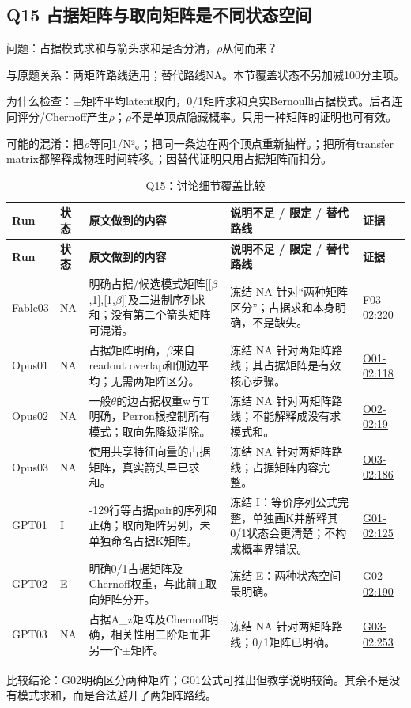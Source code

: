 \documentclass[11pt,a4paper]{article}
\begin{document}
\clearpage
\subsection{Q15 占据矩阵与取向矩阵是不同状态空间}
\label{aspect:Q15}
问题：占据模式求和与箭头求和是否分清，\ensuremath{\rho}从何而来？

与原题关系：两矩阵路线适用；替代路线NA。本节覆盖状态不另加减100分主项。

为什么检查：\ensuremath{\pm}矩阵平均latent取向，0/1矩阵求和真实Bernoulli占据模式。后者连同评分/Chernoff产生\ensuremath{\rho}；\ensuremath{\rho}不是单顶点隐藏概率。只用一种矩阵的证明也可有效。

可能的混淆：把\ensuremath{\rho}等同1/N²。；把同一条边在两个顶点重新抽样。；把所有transfer matrix都解释成物理时间转移。；因替代证明只用占据矩阵而扣分。

{\fontsize{9.0}{12.6}\selectfont
\setlength{\tabcolsep}{2.5pt}
\begin{longtable}{>{\raggedright\arraybackslash}p{}>{\raggedright\arraybackslash}p{}>{\raggedright\arraybackslash}p{}>{\raggedright\arraybackslash}p{}>{\raggedright\arraybackslash}p{}}
\caption{Q15：讨论细节覆盖比较}\\
\toprule
\textbf{Run} & \textbf{状态} & \textbf{原文做到的内容} & \textbf{说明不足 / 限定 / 替代路线} & \textbf{证据}\tabularnewline
\midrule
\endfirsthead
\toprule
\textbf{Run} & \textbf{状态} & \textbf{原文做到的内容} & \textbf{说明不足 / 限定 / 替代路线} & \textbf{证据}\tabularnewline
\midrule
\endhead
{}Fable03 & NA & 明确占据/候选模式矩阵[[\ensuremath{\beta},1],[1,\ensuremath{\beta}]]及二进制序列求和；没有第二个箭头矩阵可混淆。 & 冻结 NA 针对“两种矩阵区分”；占据求和本身明确，不是缺失。 & \hyperref[src:F03-02]{F03-02:220}\tabularnewline
{}Opus01 & NA & 占据矩阵明确，\ensuremath{\beta}来自readout overlap和侧边平均；无需两矩阵区分。 & 冻结 NA 针对两矩阵路线；其占据矩阵是有效核心步骤。 & \hyperref[src:O01-02]{O01-02:118}\tabularnewline
{}Opus02 & NA & 一般\ensuremath{\theta}的边占据权重w与T明确，Perron根控制所有模式；取向先降级消除。 & 冻结 NA 针对两矩阵路线；不能解释成没有求模式和。 & \hyperref[src:O02-02]{O02-02:19}\tabularnewline
{}Opus03 & NA & 使用共享特征向量的占据矩阵，真实箭头早已求和。 & 冻结 NA 针对两矩阵路线；占据矩阵内容完整。 & \hyperref[src:O03-02]{O03-02:186}\tabularnewline
{}GPT01 & I & 125-129行等占据pair的序列和正确；取向矩阵另列，未单独命名占据K矩阵。 & 冻结 I：等价序列公式完整，单独画K并解释其0/1状态会更清楚；不构成概率界错误。 & \hyperref[src:G01-02]{G01-02:125}\tabularnewline
{}GPT02 & E & 明确0/1占据矩阵及Chernoff权重，与此前\ensuremath{\pm}取向矩阵分开。 & 冻结 E：两种状态空间最明确。 & \hyperref[src:G02-02]{G02-02:190}\tabularnewline
{}GPT03 & NA & 占据A\_z矩阵及Chernoff明确，相关性用二阶矩而非另一个\ensuremath{\pm}矩阵。 & 冻结 NA 针对两矩阵路线；0/1矩阵已明确。 & \hyperref[src:G03-02]{G03-02:253}\tabularnewline
\bottomrule
\end{longtable}
}
比较结论：G02明确区分两种矩阵；G01公式可推出但教学说明较简。其余不是没有模式求和，而是合法避开了两矩阵路线。
\end{document}
